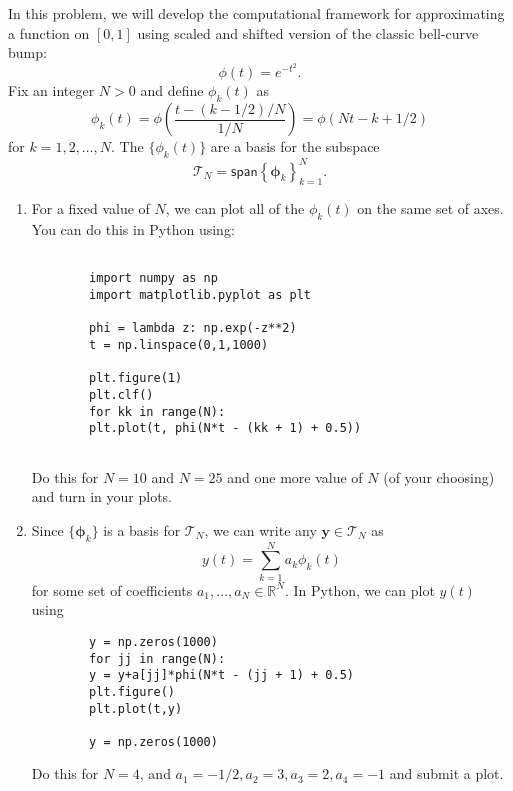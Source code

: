 \documentclass[11pt,twoside]{article}
\begin{document}
In this problem, we will develop the computational framework for approximating a function on $[0,1]$ using scaled and shifted version of the classic bell-curve bump:
\[
        \phi(t) = e^{-t^2}.
\]
Fix an integer $N>0$ and define $\phi_{k}(t)$ as
\[
        \phi_{k}(t) = \phi\left(\frac{t-(k-1/2)/N}{1/N}\right) = \phi\left(Nt - k + 1/2\right)
\]
for $k=1,2,\ldots,N$.  The $\{\phi_k(t)\}$ are a basis for the subspace
\[
        \mathcal{T}_N = \mathsf{span}\left\{\mathbf{\phi}_k\right\}_{k=1}^N.
\]
\begin{enumerate}[label=(\alph*)]
        
        \item For a fixed value of $N$, we can plot all of the $\phi_k(t)$ on the same set of axes. You can do this in Python using:
        \begin{verbatim}

        import numpy as np
        import matplotlib.pyplot as plt

        phi = lambda z: np.exp(-z**2)
        t = np.linspace(0,1,1000)

        plt.figure(1)
        plt.clf()
        for kk in range(N):
        plt.plot(t, phi(N*t - (kk + 1) + 0.5))
    
        \end{verbatim}  
        
        Do this for $N=10$ and $N=25$ and one more value of $N$ (of your choosing) and turn in your plots.
        
        \item Since $\{\mathbf{\phi}_k\}$ is a basis for $\mathcal{T}_N$, we can write any $\mathbf{y}\in \mathcal{T}_N$ as
        \[
                y(t) = \sum_{k=1}^N a_k\phi_k(t)
        \]
        for some set of coefficients $a_1,\ldots,a_N\in\mathbb{R}^N$.  In Python, we can plot $y(t)$ using
        
        \begin{verbatim}
        y = np.zeros(1000)
        for jj in range(N):
        y = y+a[jj]*phi(N*t - (jj + 1) + 0.5)
        plt.figure()
        plt.plot(t,y)

        y = np.zeros(1000)

        \end{verbatim}
        
        
        
        Do this for $N=4$, and $a_1=-1/2,a_2=3,a_3=2,a_4=-1$ and submit a plot.
        

\end{enumerate}
\end{document}
